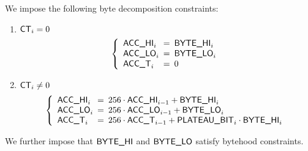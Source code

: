 We impose the following byte decomposition constraints:
\begin{enumerate}
	\item \If $\textsf{CT}_{i} = 0$ \Then
	\[
	\left\{
	\begin{array}{lcl}
		\acc{HI}_{i}	& \!\!\! = \!\!\! & \byteCol{HI}_{i} \\
		\acc{LO}_{i}	& \!\!\! = \!\!\! & \byteCol{LO}_{i} \\
		\acc{T}_{i} 	& \!\!\! = \!\!\! & 0 \\
	\end{array}
	\right.
	\]
	\item \If $\textsf{CT}_{i} \neq 0$ \Then 
	\[
	\left\{
	\begin{array}{lcl}
		\acc{HI}_{i} & \!\!\! = \!\!\! & 256 \cdot \acc{HI}_{i - 1} + \byteCol{HI}_{i} \\
		\acc{LO}_{i} & \!\!\! = \!\!\! & 256 \cdot \acc{LO}_{i - 1} + \byteCol{LO}_{i} \\
		\acc{T}_{i}  & \!\!\! = \!\!\! & 256 \cdot \acc{T}_{i - 1}  + \plateauBit_{i} \cdot \byteCol{HI}_{i} \\
	\end{array}
	\right.
	\]
\end{enumerate}
We further impose that $\textsf{BYTE}\textsf{\_HI}$ and $\textsf{BYTE}\textsf{\_LO}$ satisfy bytehood constraints.
